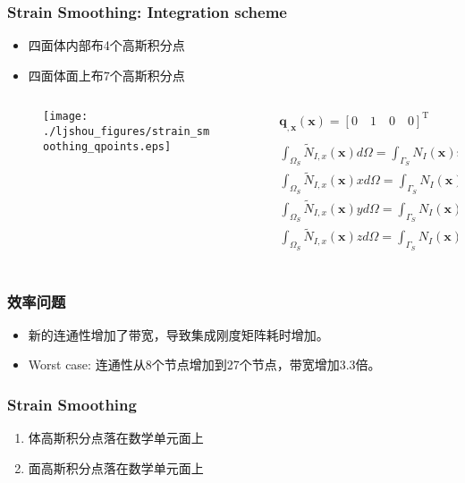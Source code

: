 \documentclass[mathserif]{beamer}
\begin{document}
\begin{CJK}{UTF8}{gkai}
\begin{frame}
	\frametitle{Strain Smoothing: Integration scheme}
	\begin{itemize}
		\item 四面体内部布4个高斯积分点
		\item 四面体面上布7个高斯积分点
	\end{itemize}
	\begin{columns}
		\begin{column}[pos]{0.5\textwidth}
			\begin{figure}
				\texttt{[image: ./ljshou\_figures/strain\_smoothing\_qpoints.eps]}
			\end{figure}
		\end{column}
			\begin{column}[pos]{0.5\textwidth}
			\tiny
			\begin{align*}
				&\mathbf{q_{,x}(x)}=[0 \quad 1 \quad 0 \quad 0]^{\text{T}} \\
				\\
				&\int_{\Omega_S}\tilde{N}_{I,x}(\mathbf{x})d\Omega = 					\int_{\Gamma_S}N_I(\mathbf{x})n_xd\Gamma \\
				&\int_{\Omega_S}\tilde{N}_{I,x}(\mathbf{x})xd\Omega = \int_{\Gamma_S}N_I(\mathbf{x})xn_xd\Gamma 
										- \int_{\Omega_S}N_I(\mathbf{x})d\Omega \\
				&\int_{\Omega_S}\tilde{N}_{I,x}(\mathbf{x})yd\Omega = \int_{\Gamma_S}N_I(\mathbf{x})yn_xd\Gamma \\
				&\int_{\Omega_S}\tilde{N}_{I,x}(\mathbf{x})zd\Omega = \int_{\Gamma_S}N_I(\mathbf{x})zn_xd\Gamma \\
			\end{align*}
		\end{column}
	
	\end{columns}
	
\end{frame}

\begin{frame}
	\frametitle{效率问题}
	\begin{itemize}
		\item 新的连通性增加了带宽，导致集成刚度矩阵耗时增加。
		\item Worst case: 连通性从8个节点增加到27个节点，带宽增加3.3倍。
	\end{itemize}
\end{frame}

\begin{frame}
	\frametitle{Strain Smoothing}			
	\begin{enumerate}
		\item 体高斯积分点落在数学单元面上	
		\item 面高斯积分点落在数学单元面上
	\end{enumerate}


\end{frame}
\end{CJK}
\end{document}
